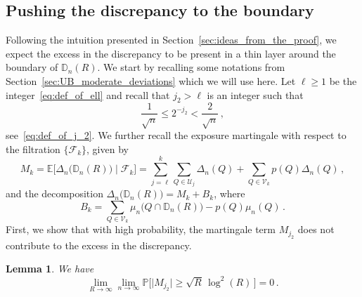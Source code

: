 \documentclass[11pt]{amsart}
\newtheorem{lemma}[theorem]{Lemma}
\theoremstyle{definition}
\theoremstyle{remark}
\numberwithin{equation}{section}
\newcommand{\bD}{\mathbb D}
\newcommand{\bP}{\mathbb P}
\newcommand{\bE}{\mathbb E}
\begin{document}
	\subsection{Pushing the discrepancy to the boundary}
	Following the intuition presented in Section~\ref{sec:ideas_from_the_proof}, we expect the excess in the discrepancy to be present in a thin layer around the boundary of $\bD_n(R)$. We start by recalling some notations from Section~\ref{sec:UB_moderate_deviations} which we will use here. Let $\ell\ge 1$ be the integer~\eqref{eq:def_of_ell} and recall that $j_2>\ell$ is an integer such that
	\[
	\frac{1}{\sqrt{n}} \le 2^{-j_2} < \frac{2}{\sqrt{n}} \, ,
	\]
	see~\eqref{eq:def_of_j_2}. We further recall the exposure martingale with respect to the filtration $\{\mathcal{F}_k\}$, given by
	\begin{equation*}
		M_k = \bE\big[\Delta_n\big(\bD_n(R)\big) \mid \mathcal{F}_k\big] = \sum_{j=\ell}^{k} \sum_{Q\in \mathcal{U}_j} \Delta_{n}(Q) + \sum_{Q\in \mathcal{V}_{k}} p(Q)\Delta_n(Q) \, ,
	\end{equation*}
	and the decomposition $\Delta_{n}\big(\bD_n(R)\big) = M_{k} + B_{k}$, where
	\begin{equation*}
		B_{k} = \sum_{Q\in \mathcal{V}_{k}} \mu_n\big(Q\cap \bD_n(R)\big) - p(Q) \mu_n(Q) \, .
	\end{equation*}
	First, we show that with high probability, the martingale term $M_{j_2}$ does not contribute to the excess in the discrepancy.
	\begin{lemma}		\label{lemma:moderate_deviations_lower_bound_push_disc_to_boundary}
		We have
		\[
		\lim_{R\to \infty} \lim_{n\to \infty} \bP\Big[\big|M_{j_2}\big| \ge \sqrt{R} \, \log^2(R) \, \Big] = 0 \, .
		\]
	\end{lemma}
\end{document}
